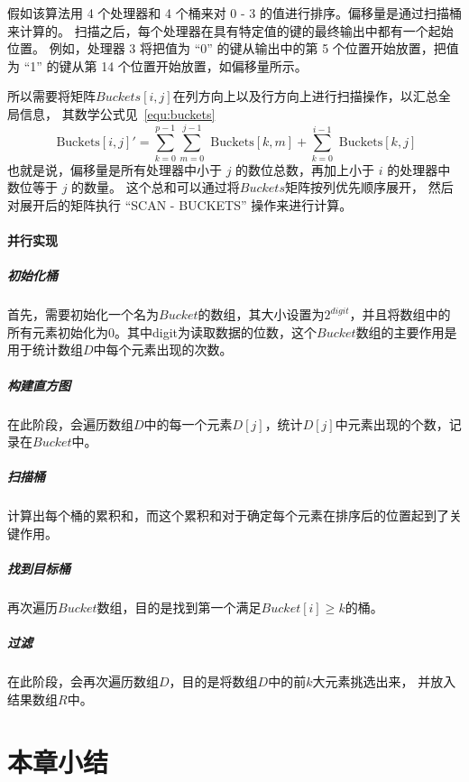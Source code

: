 假如该算法用 4 个处理器和 4 个桶来对 0 - 3 的值进行排序。偏移量是通过扫描桶来计算的。
扫描之后，每个处理器在具有特定值的键的最终输出中都有一个起始位置。
例如，处理器 3 将把值为 “0” 的键从输出中的第 5 个位置开始放置，把值为 “1” 的键从第 14 个位置开始放置，如偏移量所示。

所以需要将矩阵\(Buckets[i, j]\)在列方向上以及行方向上进行扫描操作，以汇总全局信息，
其数学公式见~\ref{equ:buckets}
\begin{equation}
    \text{ Buckets}[i, j]' = \sum_{k = 0}^{p - 1} \sum_{m = 0}^{j - 1} \text{ Buckets}[k, m] + \sum_{k = 0}^{i - 1} \text{ Buckets}[k, j]
    \label{equ:buckets}
\end{equation}
也就是说，偏移量是所有处理器中小于 $j$ 的数位总数，再加上小于 $i$ 的处理器中数位等于 $j$ 的数量。
这个总和可以通过将$Buckets$矩阵按列优先顺序展开，
然后对展开后的矩阵执行 “SCAN - BUCKETS” 操作来进行计算。
\paragraph{并行实现}
\subparagraph{初始化桶}

首先，需要初始化一个名为\(Bucket\)的数组，其大小设置为\(2^{digit}\)，并且将数组中的所有元素初始化为\(0\)。其中digit为读取数据的位数，这个\(Bucket\)数组的主要作用是用于统计数组\(D\)中每个元素出现的次数。
\subparagraph{构建直方图}

在此阶段，会遍历数组\(D\)中的每一个元素\(D[j]\)，统计\(D[j]\)中元素出现的个数，记录在\(Bucket\)中。
\subparagraph{扫描桶}

计算出每个桶的累积和，而这个累积和对于确定每个元素在排序后的位置起到了关键作用。

\subparagraph{找到目标桶}

再次遍历\(Bucket\)数组，目的是找到第一个满足\(Bucket[i] \geq k\)的桶。
\subparagraph{过滤}

在此阶段，会再次遍历数组\(D\)，目的是将数组\(D\)中的前\(k\)大元素挑选出来，
并放入结果数组\(R\)中。





  
\section{本章小结}
